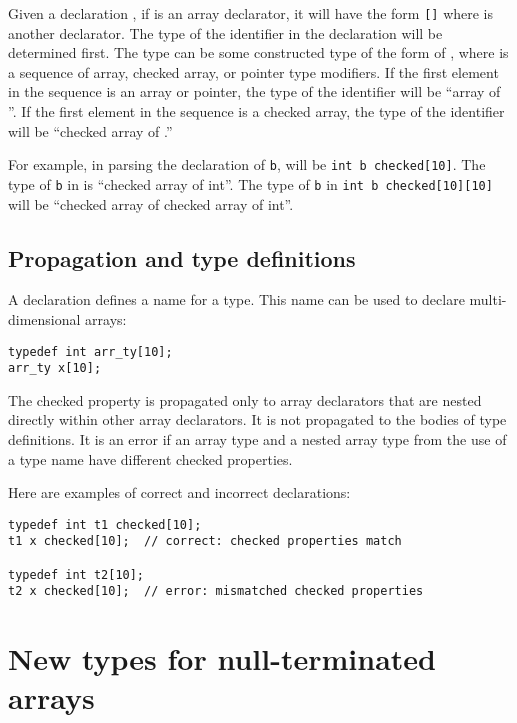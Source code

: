 Given a declaration  , if  is an array
declarator, it will have the form
\lstinline|[|\lstinline|]|
where  is another declarator. The type of the identifier in the
declaration  will be determined first. The type can be some
constructed type of the form  of , where
 is a sequence of array, checked array, or pointer
type modifiers. If the first element in the 
sequence is an array or pointer, the type of the identifier will be
 ``array of  ''. If the first element in the
 sequence is a checked array, the type of the
identifier will be  ``checked array of .''

For example, in parsing the declaration of \lstinline+b+, 
will be \lstinline+int b checked[10]+. The type of \lstinline+b+ in
 is ``checked array of int''. The type of \lstinline+b+ in
\lstinline+int b checked[10][10]+ will be ``checked array of
checked array of int''.

\subsection{Propagation and type definitions}

A  declaration defines a name for a type. This name
can be used to declare multi-dimensional arrays:
\begin{lstlisting}
typedef int arr_ty[10];
arr_ty x[10];
\end{lstlisting}
The checked property is propagated only to array declarators that are
nested directly within other array declarators.   It is not propagated to
the bodies of type definitions.  It is an error if an array type and a nested
array type from the use of a type name have different checked properties.

Here are examples of correct and incorrect declarations:
\begin{lstlisting}
typedef int t1 checked[10];
t1 x checked[10];  // correct: checked properties match

typedef int t2[10];
t2 x checked[10];  // error: mismatched checked properties
\end{lstlisting}

\section{New types for null-terminated arrays}
\label{section:nullterm-types}

